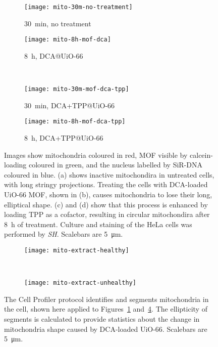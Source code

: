 \begin{figure}[p]
\centering
	\begin{subfigure}[b]{0.49\textwidth}
	\texttt{[image: mito-30m-no-treatment]}
	\caption{\SI{30}{\minute}, no treatment} \label{fig:mito-30m-no-treatment}
	\end{subfigure}
	\hfill
	\begin{subfigure}[b]{0.49\textwidth}
	\texttt{[image: mito-8h-mof-dca]}
	\caption{\SI{8}{\hour}, DCA@UiO-66} \label{fig:mito-8h-mof-dca}
	\end{subfigure}
	
	~\newline
		\begin{subfigure}[b]{0.49\textwidth}
	\texttt{[image: mito-30m-mof-dca-tpp]}
	\caption{\SI{30}{\minute}, DCA+TPP@UiO-66}\label{fig:mito-30m-mof-dca-tpp}
	\end{subfigure}
	\hfill
	\begin{subfigure}[b]{0.49\textwidth}
	\texttt{[image: mito-8h-mof-dca-tpp]}
	\caption{\SI{8}{\hour}, DCA+TPP@UiO-66}\label{fig:mito-8h-mof-dca-tpp}
	\end{subfigure}
\caption[MOFs: UiO-66 MOF loaded with DCA changes mitochondria's shape]{Images show mitochondria coloured in red, MOF visible by calcein-loading coloured in green, and the nucleus labelled by SiR-DNA coloured in blue. (a) shows inactive mitochondira in untreated cells, with long stringy projections. Treating the cells with DCA-loaded UiO-66 MOF, shown in (b), causes mitochondria to lose their long, elliptical shape. (c) and (d) show that this process is enhanced by loading TPP as a cofactor, resulting in circular mitochondira after \SI{8}{\hour} of treatment. Culture and staining of the HeLa cells was performed by \textit{SH}. Scalebars are \SI{5}{\micro\metre}. }
\label{fig:mito-SIM-images}
\end{figure}
\begin{figure}[p]
\centering
	\begin{subfigure}[b]{0.49\textwidth}

\texttt{[image: mito-extract-healthy]}
	\caption{}
	\end{subfigure} ~
	\begin{subfigure}[b]{0.49\textwidth}
	\texttt{[image: mito-extract-unhealthy]}
	\caption{}
	\end{subfigure}
\caption[MOFs: Mitochondria segmentation in Cell Profiler allow statistical shape analysis]{The Cell Profiler\cite{carpenter2006cellprofiler} protocol identifies and segments mitochondria in the cell, shown here applied to Figures~\ref{fig:mito-30m-no-treatment} and~\ref{fig:mito-8h-mof-dca-tpp}. The ellipticity of segments is calculated to provide statistics about the change in mitochondria shape caused by DCA-loaded UiO-66. Scalebars are \SI{5}{\micro\metre}. }
\label{fig:cell-profiler-segmentation}
\end{figure}


